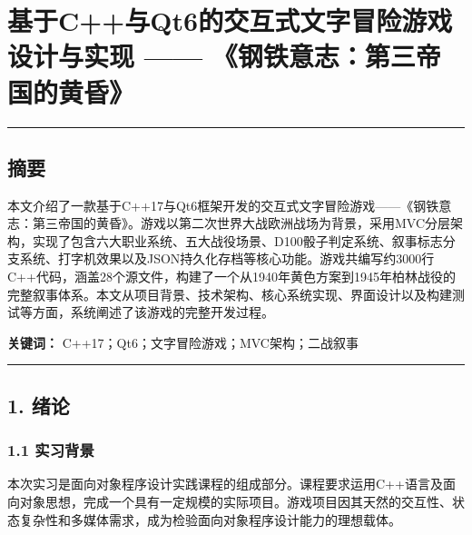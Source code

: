 \hypertarget{ux57faux4e8ecux4e0eqt6ux7684ux4ea4ux4e92ux5f0fux6587ux5b57ux5192ux9669ux6e38ux620fux8bbeux8ba1ux4e0eux5b9eux73b0-ux94a2ux94c1ux610fux5fd7ux7b2cux4e09ux5e1dux56fdux7684ux9ec4ux660f}{%
\section{基于C++与Qt6的交互式文字冒险游戏设计与实现 ------
《钢铁意志：第三帝国的黄昏》}\label{ux57faux4e8ecux4e0eqt6ux7684ux4ea4ux4e92ux5f0fux6587ux5b57ux5192ux9669ux6e38ux620fux8bbeux8ba1ux4e0eux5b9eux73b0-ux94a2ux94c1ux610fux5fd7ux7b2cux4e09ux5e1dux56fdux7684ux9ec4ux660f}}

\begin{center}\rule{0.5\linewidth}{0.5pt}\end{center}

\hypertarget{ux6458ux8981}{%
\subsection{摘要}\label{ux6458ux8981}}

本文介绍了一款基于C++17与Qt6框架开发的交互式文字冒险游戏------《钢铁意志：第三帝国的黄昏》。游戏以第二次世界大战欧洲战场为背景，采用MVC分层架构，实现了包含六大职业系统、五大战役场景、D100骰子判定系统、叙事标志分支系统、打字机效果以及JSON持久化存档等核心功能。游戏共编写约3000行C++代码，涵盖28个源文件，构建了一个从1940年黄色方案到1945年柏林战役的完整叙事体系。本文从项目背景、技术架构、核心系统实现、界面设计以及构建测试等方面，系统阐述了该游戏的完整开发过程。

\textbf{关键词：} C++17；Qt6；文字冒险游戏；MVC架构；二战叙事

\begin{center}\rule{0.5\linewidth}{0.5pt}\end{center}

\hypertarget{ux7eeaux8bba}{%
\subsection{1. 绪论}\label{ux7eeaux8bba}}

\hypertarget{ux5b9eux4e60ux80ccux666f}{%
\subsubsection{1.1 实习背景}\label{ux5b9eux4e60ux80ccux666f}}

本次实习是面向对象程序设计实践课程的组成部分。课程要求运用C++语言及面向对象思想，完成一个具有一定规模的实际项目。游戏项目因其天然的交互性、状态复杂性和多媒体需求，成为检验面向对象程序设计能力的理想载体。

